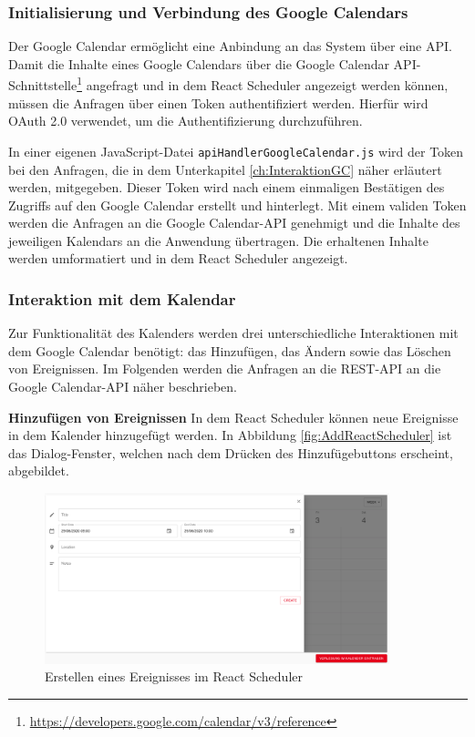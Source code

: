 \subsubsection{Initialisierung und Verbindung des Google Calendars}
Der Google Calendar ermöglicht eine Anbindung an das System über eine \ac{API}.
Damit die Inhalte eines Google Calendars über die Google Calendar \ac{API}-Schnittstelle\footnote{\url{https://developers.google.com/calendar/v3/reference}} angefragt und in dem React Scheduler angezeigt werden können, müssen die Anfragen über einen Token authentifiziert werden. 
Hierfür wird OAuth 2.0 verwendet, um die Authentifizierung durchzuführen.\autocite[Vgl.][]{GCApi} 

In einer eigenen JavaScript-Datei \texttt{apiHandlerGoogleCalendar.js} wird der Token bei den Anfragen, die in dem Unterkapitel \vref{ch:InteraktionGC} näher erläutert werden, mitgegeben. Dieser Token wird nach einem einmaligen Bestätigen des Zugriffs auf den Google Calendar erstellt und hinterlegt. 
Mit einem validen Token werden die Anfragen an die Google Calendar-\ac{API} genehmigt und die Inhalte des jeweiligen Kalendars an die Anwendung übertragen. Die erhaltenen Inhalte werden umformatiert und in dem React Scheduler angezeigt.


\subsubsection{Interaktion mit dem Kalendar}\label{ch:InteraktionGC}
Zur Funktionalität des Kalenders werden drei unterschiedliche Interaktionen mit dem Google Calendar benötigt: das Hinzufügen, das Ändern sowie das Löschen von Ereignissen. Im Folgenden werden die Anfragen an die REST-\ac{API} an die Google Calendar-\ac{API} näher beschrieben.

\textbf{Hinzufügen von Ereignissen}\newline
In dem React Scheduler können neue Ereignisse in dem Kalender hinzugefügt werden.
In Abbildung \vref{fig:AddReactScheduler} ist das Dialog-Fenster, welchen nach dem Drücken des Hinzufügebuttons erscheint, abgebildet.
\begin{figure}[H]
	\centering 
	\includegraphics[width=10cm]{img/FrontEnd/GCAdd.png}
	\caption[Erstellen eines Ereignisses im React Scheduler]{\label{fig:AddReactScheduler}Erstellen eines Ereignisses im React Scheduler\footnotemark}
\end{figure}

